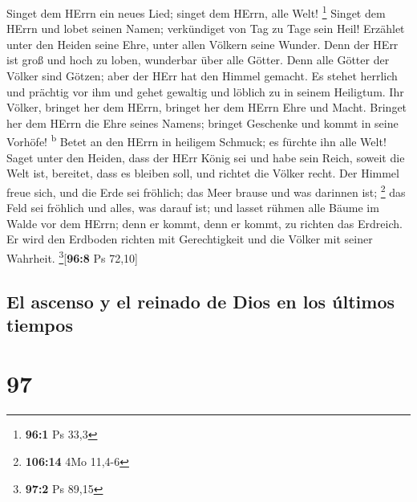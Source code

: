  Singet dem HErrn ein neues Lied; singet dem HErrn, alle
Welt! \footnote{\textbf{96:1} Ps 33,3}  Singet dem HErrn
und lobet seinen Namen; verkündiget von Tag zu Tage sein Heil!
 Erzählet unter den Heiden seine Ehre, unter allen Völkern
seine Wunder.  Denn der HErr ist groß und hoch zu loben,
wunderbar über alle Götter.  Denn alle Götter der Völker
sind Götzen; aber der HErr hat den Himmel gemacht.  Es
stehet herrlich und prächtig vor ihm und gehet gewaltig und löblich zu
in seinem Heiligtum.  Ihr Völker, bringet her dem HErrn,
bringet her dem HErrn Ehre und Macht.  Bringet her dem
HErrn die Ehre seines Namens; bringet Geschenke und kommt in seine
Vorhöfe! \textsuperscript{b}  Betet an den HErrn in
heiligem Schmuck; es fürchte ihn alle Welt!  Saget unter
den Heiden, dass der HErr König sei und habe sein Reich, soweit die Welt
ist, bereitet, dass es bleiben soll, und richtet die Völker recht.
 Der Himmel freue sich, und die Erde sei fröhlich; das
Meer brause und was darinnen ist; \footnote{\textbf{106:14} 4Mo 11,4-6}
 das Feld sei fröhlich und alles, was darauf ist; und
lasset rühmen alle Bäume im Walde  vor dem HErrn; denn er
kommt, denn er kommt, zu richten das Erdreich. Er wird den Erdboden
richten mit Gerechtigkeit und die Völker mit seiner Wahrheit.
\footnote{\textbf{97:2} Ps 89,15}{[}\textbf{96:8} Ps 72,10{]}

\hypertarget{el-ascenso-y-el-reinado-de-dios-en-los-uxfaltimos-tiempos}{%
\subsection{El ascenso y el reinado de Dios en los últimos
tiempos}\label{el-ascenso-y-el-reinado-de-dios-en-los-uxfaltimos-tiempos}}

\hypertarget{section-96}{%
\section{97}\label{section-96}}

